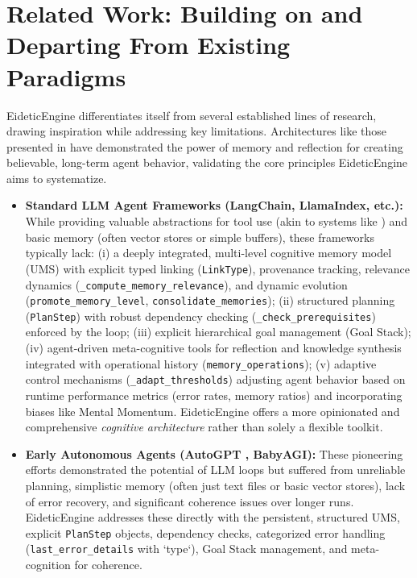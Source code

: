\documentclass[12pt,a4paper]{article}
\newcommand{\code}[1]{\nolinkurl{#1}}
\begin{document}
\section{Related Work: Building on and Departing From Existing Paradigms}

EideticEngine differentiates itself from several established lines of research, drawing inspiration while addressing key limitations. Architectures like those presented in \cite{Ref13} have demonstrated the power of memory and reflection for creating believable, long-term agent behavior, validating the core principles EideticEngine aims to systematize.

\begin{itemize}
    \item \textbf{Standard LLM Agent Frameworks (LangChain, LlamaIndex, etc.):} While providing valuable abstractions for tool use (akin to systems like \cite{Ref16}) and basic memory (often vector stores or simple buffers), these frameworks typically lack: (i) a deeply integrated, multi-level cognitive memory model (UMS) with explicit typed linking (\code{LinkType}), provenance tracking, relevance dynamics (\code{\_compute\_memory\_relevance}), and dynamic evolution (\code{promote\_memory\_level}, \code{consolidate\_memories}); (ii) structured planning (\code{PlanStep}) with robust dependency checking (\code{\_check\_prerequisites}) enforced by the loop; (iii) explicit hierarchical goal management (Goal Stack); (iv) agent-driven meta-cognitive tools for reflection and knowledge synthesis integrated with operational history (\code{memory\_operations}); (v) adaptive control mechanisms (\code{\_adapt\_thresholds}) adjusting agent behavior based on runtime performance metrics (error rates, memory ratios) and incorporating biases like Mental Momentum. EideticEngine offers a more opinionated and comprehensive \textit{cognitive architecture} rather than solely a flexible toolkit.

    \item \textbf{Early Autonomous Agents (AutoGPT \cite{Ref15}, BabyAGI):} These pioneering efforts demonstrated the potential of LLM loops but suffered from unreliable planning, simplistic memory (often just text files or basic vector stores), lack of error recovery, and significant coherence issues over longer runs. EideticEngine addresses these directly with the persistent, structured UMS, explicit \code{PlanStep} objects, dependency checks, categorized error handling (\code{last\_error\_details} with `type`), Goal Stack management, and meta-cognition for coherence.


\end{itemize}
\end{document}

